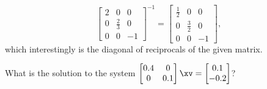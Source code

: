 \begin{example}
\begin{solution}
\begin{equation*}
\begin{bmatrix} 2&0&0\\0&\frac23&0\\0&0&-1 \end{bmatrix}^{-1}
=\begin{bmatrix} \frac12&0&0\\0&\frac32&0\\0&0&-1 \end{bmatrix},
\end{equation*}
which interestingly is the diagonal of reciprocals of the given matrix.
\end{solution}
\end{example}




\begin{activity}
What is the solution to the system \(\begin{bmatrix} 0.4&0\\0&0.1 \end{bmatrix}\xv=\begin{bmatrix} 0.1\\-0.2 \end{bmatrix}\)?
\end{activity}



\begin{comment}
Diagonal matrices are `stretchers' in the coordinate directions, e.g.~the rack.  They also can reflect which changes orientation.  They are a first example of a linear transformation.  Their inverse has to undo the stretching.
\end{comment}

